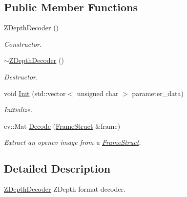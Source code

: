 \subsection*{Public Member Functions}
\begin{DoxyCompactItemize}
\item 
\mbox{\label{classmoetsi_1_1ssp_1_1ZDepthDecoder_a69f45e16839baaa30da870efbfb48101}} 
\hyperlink{classmoetsi_1_1ssp_1_1ZDepthDecoder_a69f45e16839baaa30da870efbfb48101}{Z\+Depth\+Decoder} ()
\begin{DoxyCompactList}\small\item\em Constructor. \end{DoxyCompactList}\item 
\mbox{\label{classmoetsi_1_1ssp_1_1ZDepthDecoder_ae189577c97401e787d240c9854d83661}} 
\hyperlink{classmoetsi_1_1ssp_1_1ZDepthDecoder_ae189577c97401e787d240c9854d83661}{$\sim$\+Z\+Depth\+Decoder} ()
\begin{DoxyCompactList}\small\item\em Destructor. \end{DoxyCompactList}\item 
void \hyperlink{classmoetsi_1_1ssp_1_1ZDepthDecoder_aad7fe4789b709fc3496a1837a8ff86e5}{Init} (std\+::vector$<$ unsigned char $>$ parameter\+\_\+data)
\begin{DoxyCompactList}\small\item\em Initialize. \end{DoxyCompactList}\item 
cv\+::\+Mat \hyperlink{classmoetsi_1_1ssp_1_1ZDepthDecoder_a43226095658d616f7e38df1d43c2f88a}{Decode} (\hyperlink{structmoetsi_1_1ssp_1_1FrameStruct}{Frame\+Struct} \&frame)
\begin{DoxyCompactList}\small\item\em Extract an opencv image from a \hyperlink{structmoetsi_1_1ssp_1_1FrameStruct}{Frame\+Struct}. \end{DoxyCompactList}\end{DoxyCompactItemize}


\subsection{Detailed Description}
\hyperlink{classmoetsi_1_1ssp_1_1ZDepthDecoder}{Z\+Depth\+Decoder} Z\+Depth format decoder. 

